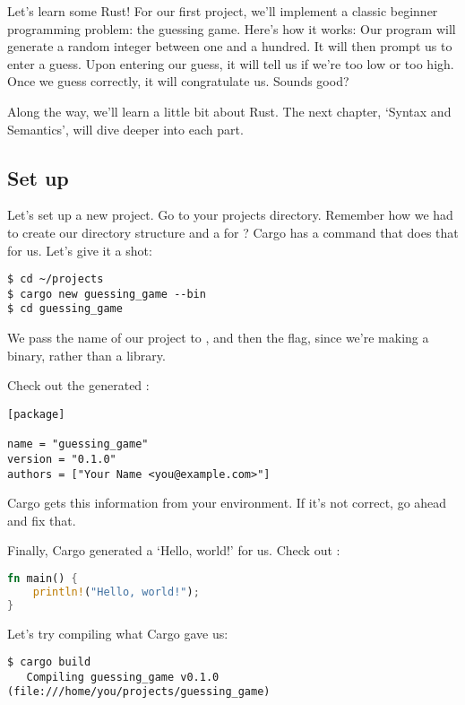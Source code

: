 Let’s learn some Rust! For our first project, we’ll implement a classic beginner programming problem: the guessing game. 
Here’s how it works: Our program will generate a random integer between one and a hundred. It will then prompt us to enter 
a guess. Upon entering our guess, it will tell us if we’re too low or too high. Once we guess correctly, it will congratulate 
us. Sounds good?

\blank

Along the way, we’ll learn a little bit about Rust. The next chapter, ‘Syntax and Semantics’, will dive deeper into each part.

\subsection{Set up}

Let’s set up a new project. Go to your projects directory. Remember how we had to create our directory structure and a 
 for ? Cargo has a command that does that for us. Let’s give it a shot:

\begin{verbatim}
$ cd ~/projects
$ cargo new guessing_game --bin
$ cd guessing_game
\end{verbatim}

We pass the name of our project to , and then the  flag, since we’re making a binary, rather than 
a library.

\blank

Check out the generated :

\begin{verbatim}
[package]

name = "guessing_game"
version = "0.1.0"
authors = ["Your Name <you@example.com>"]
\end{verbatim}

Cargo gets this information from your environment. If it’s not correct, go ahead and fix that.

\blank

Finally, Cargo generated a ‘Hello, world!’ for us. Check out :

\begin{lstlisting}[language=Rust]
fn main() {
    println!("Hello, world!");
}
\end{lstlisting}

Let’s try compiling what Cargo gave us:

\begin{verbatim}
$ cargo build
   Compiling guessing_game v0.1.0 (file:///home/you/projects/guessing_game)  
\end{verbatim}

